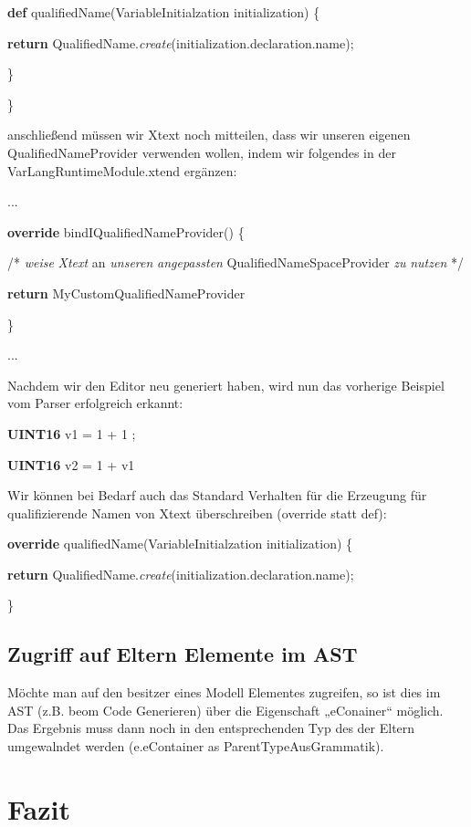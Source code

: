 \documentclass[a4]{article}
\begin{document}
\textbf{def} qualifiedName(VariableInitialzation initialization) \{

\textbf{return}
QualifiedName.\emph{create}(initialization.declaration.name);

\}

\}

anschließend müssen wir Xtext noch mitteilen, dass wir unseren eigenen
QualifiedNameProvider verwenden wollen, indem wir folgendes in der
VarLangRuntimeModule.xtend ergänzen:

...

\textbf{override} bindIQualifiedNameProvider() \{

/* \emph{weise} \emph{Xtext} an \emph{unseren} \emph{angepassten}
QualifiedNameSpaceProvider \emph{zu} \emph{nutzen} */

\textbf{return} MyCustomQualifiedNameProvider

\}

...

Nachdem wir den Editor neu generiert haben, wird nun das vorherige
Beispiel vom Parser erfolgreich erkannt:

\textbf{UINT16} v1 = 1 + 1 ;

\textbf{UINT16} v2 = 1 + v1

Wir können bei Bedarf auch das Standard Verhalten für die Erzeugung für
qualifizierende Namen von Xtext überschreiben (override statt def):

\textbf{override} qualifiedName(VariableInitialzation initialization) \{

\textbf{return}
QualifiedName.\emph{create}(initialization.declaration.name);

\}

\subsection[Zugriff auf Eltern Elemente im
AST]{\texorpdfstring{\protect\hypertarget{anchor-55}{}{}Zugriff auf
Eltern Elemente im
AST}{Zugriff auf Eltern Elemente im AST}}\label{zugriff-auf-eltern-elemente-im-ast}

Möchte man auf den besitzer eines Modell Elementes zugreifen, so ist
dies im AST (z.B. beom Code Generieren) über die Eigenschaft
„eConainer`` möglich. Das Ergebnis muss dann noch in den entsprechenden
Typ des der Eltern umgewalndet werden (e.eContainer as
ParentTypeAusGrammatik).

\section[Fazit]{\texorpdfstring{\protect\hypertarget{anchor-56}{}{}Fazit}{Fazit}}\label{fazit}
\end{document}
